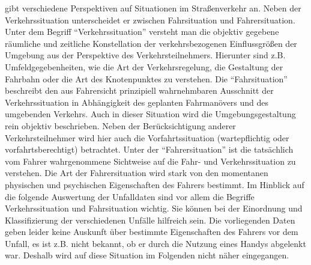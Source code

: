 \Textcite[S. 43]{Reichart.2001} gibt verschiedene Perspektiven auf Situationen im Straßenverkehr an. Neben der Verkehrssituation unterscheidet er zwischen Fahrsituation und Fahrersituation. Unter dem Begriff \enquote{Verkehrssituation} versteht man die objektiv gegebene räumliche und zeitliche Konstellation der verkehrsbezogenen Einflussgrößen der Umgebung aus der Perspektive des Verkehrsteilnehmers. Hierunter sind z.B. Umfeldgegebenheiten, wie die Art der Verkehrsregelung, die Gestaltung der Fahrbahn oder die Art des Knotenpunktes zu verstehen. Die \enquote{Fahrsituation} beschreibt den aus Fahrersicht prinzipiell wahrnehmbaren Ausschnitt der Verkehrssituation in Abhängigkeit des geplanten Fahrmanövers und des umgebenden Verkehrs. Auch in dieser Situation wird die Umgebungsgestaltung rein objektiv beschrieben. Neben der Berücksichtigung anderer Verkehrsteilnehmer wird hier auch die Vorfahrtssituation (wartepflichtig oder vorfahrtsberechtigt) betrachtet. Unter der \enquote{Fahrersituation} ist die tatsächlich vom Fahrer wahrgenommene Sichtweise auf die Fahr- und Verkehrssituation zu verstehen. Die Art der Fahrersituation wird stark von den momentanen physischen und psychischen Eigenschaften des Fahrers bestimmt. Im Hinblick auf die folgende Auswertung der Unfalldaten sind vor allem die Begriffe Verkehrssituation und Fahrsituation wichtig. Sie können bei der Einordnung und Klassifizierung der verschiedenen Unfälle hilfreich sein. Die vorliegenden Daten geben leider keine Auskunft über bestimmte Eigenschaften des Fahrers vor dem Unfall, es ist z.B. nicht bekannt, ob er durch die Nutzung eines Handys abgelenkt war. Deshalb wird auf diese Situation im Folgenden nicht näher eingegangen.

